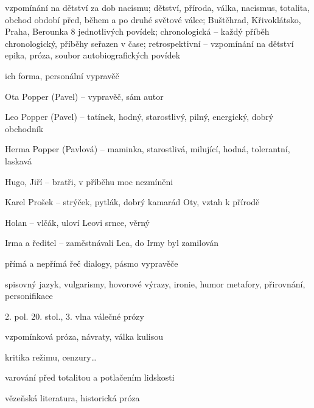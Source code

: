 {
vzpomínání na dětství za dob nacismu; dětství, příroda, válka, nacismus, totalita, obchod
období před, během a po druhé světové válce; Buštěhrad, Křivoklátsko, Praha, Berounka
8 jednotlivých povídek; chronologická -- každý příběh chronologický, příběhy
seřazen v čase; retrospektivní -- vzpomínání na dětství
epika, próza, soubor autobiografických povídek

\newpart

ich forma, personální vypravěč
\begin{compactdesc}
\item[Ota Popper (Pavel)] – vypravěč, sám autor
\item[Leo Popper (Pavel)] – tatínek, hodný, starostlivý, pilný, energický, dobrý obchodník
\item[Herma Popper (Pavlová)] – maminka, starostlivá, milující, hodná, tolerantní, laskavá
\item[Hugo, Jiří] – bratři, v příběhu moc nezmíněni
\item[Karel Prošek] – strýček, pytlák, dobrý kamarád Oty, vztah k přírodě
\item[Holan] – vlčák, uloví Leovi srnce, věrný
\item[Irma a ředitel] – zaměstnávali Lea, do Irmy byl zamilován 
\end{compactdesc}

přímá a nepřímá řeč
dialogy, pásmo vypravěče

\newpart

spisovný jazyk, vulgarismy, hovorové výrazy, ironie, humor
metafory, přirovnání, personifikace

\begin{compactitem}
	\item 2. pol. 20. stol., 3. vlna válečné prózy
	\item vzpomínková próza, návraty, válka kulisou
	\item kritika režimu, cenzury\dots
	\item varování před totalitou a potlačením lidskosti
	\item vězeňská literatura, historická próza
\end{compactitem}

}

